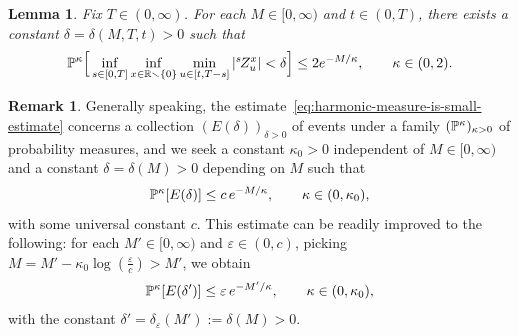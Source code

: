 \documentclass[a4paper, 11pt]{article}
\newtheorem{lem}[thm]{Lemma}
\theoremstyle{definition}
\newtheorem{remark}[thm]{Remark}
\numberwithin{equation}{section}
\numberwithin{figure}{section}
\newcommand{\bessel}[1][]{{\ifx&#1&\else{^{#1 \!}}\fi}Z}
\newcommand{\BMmeasure}[2][]{\bP^{#2}_{\!#1}}
\begin{document}
\begin{lem}\label{thm:harmonic-measure-is-small-estimate}
Fix $T \in (0,\infty)$. 
For each $M \in [0,\infty)$ and $t \in (0,T)$, 
there exists a constant $\delta = \delta(M,T,t) > 0$ such that
\begin{align}\label{eq:harmonic-measure-is-small-estimate}
\BMmeasure{\kappa}\Big[\inf_{s \in [0,T]} \inf_{x \in \bR \smallsetminus \{0\}} \min_{u \in [t,T-s]} |\bessel[s]^x_u| < \delta \Big] 
		\le 2 e^{-M/\kappa} , \qquad \kappa \in (0,2).
	\end{align}
\end{lem}


\begin{remark}\label{rem:improvement-of-constant}
Generally speaking, the estimate~\eqref{eq:harmonic-measure-is-small-estimate} concerns a collection $(E(\delta))_{\delta > 0}$ of events under a family $(\BMmeasure{\kappa})_{\kappa > 0}$ of probability measures, and we seek a constant $\kappa_0 > 0$ independent of $M \in [0,\infty)$ and a constant $\delta = \delta(M) > 0$ depending on $M$ such that
\begin{align*}
\BMmeasure{\kappa}[E(\delta)] \le c \, e^{-M/\kappa} , \qquad \kappa \in (0,\kappa_0) ,
\end{align*}
with some universal constant $c$.  
This estimate can be readily improved to the following: 
for each $M' \in [0,\infty)$ and $\varepsilon \in (0,c)$, 
picking $M = M' - \kappa_0 \log (\frac{\varepsilon}{c}) > M'$, we obtain 
\begin{align*}
\BMmeasure{\kappa}[E(\delta')] 
\le \varepsilon \, e^{- M'/\kappa} 
, \qquad \kappa \in (0,\kappa_0) ,
\end{align*}
with the constant $\delta' = \delta_\varepsilon(M') := \delta(M) > 0$.
\end{remark}
\end{document}
